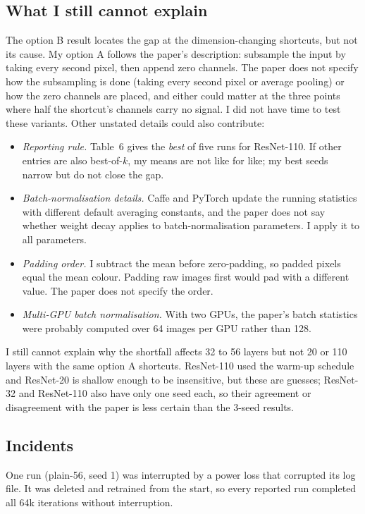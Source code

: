 \documentclass[conference]{IEEEtran}
\begin{document}
\subsection{What I still cannot explain}
The option B result locates the gap at the dimension-changing shortcuts, but not its cause. My option A follows the paper's description: subsample the input by taking every second pixel, then append zero channels. The paper does not specify how the subsampling is done (taking every second pixel or average pooling) or how the zero channels are placed, and either could matter at the three points where half the shortcut's channels carry no signal. I did not have time to test these variants. Other unstated details could also contribute:
\begin{itemize}
\item \emph{Reporting rule.} Table~6 gives the \emph{best} of five runs for ResNet-110. If other entries are also best-of-$k$, my means are not like for like; my best seeds narrow but do not close the gap.
\item \emph{Batch-normalisation details.} Caffe and PyTorch update the running statistics with different default averaging constants, and the paper does not say whether weight decay applies to batch-normalisation parameters. I apply it to all parameters.
\item \emph{Padding order.} I subtract the mean before zero-padding, so padded pixels equal the mean colour. Padding raw images first would pad with a different value. The paper does not specify the order.
\item \emph{Multi-GPU batch normalisation.} With two GPUs, the paper's batch statistics were probably computed over 64 images per GPU rather than 128.
\end{itemize}
I still cannot explain why the shortfall affects 32 to 56 layers but not 20 or 110 layers with the same option A shortcuts. ResNet-110 used the warm-up schedule and ResNet-20 is shallow enough to be insensitive, but these are guesses; ResNet-32 and ResNet-110 also have only one seed each, so their agreement or disagreement with the paper is less certain than the 3-seed results.

\subsection{Incidents}
One run (plain-56, seed 1) was interrupted by a power loss that corrupted its log file. It was deleted and retrained from the start, so every reported run completed all 64k iterations without interruption.
\end{document}
